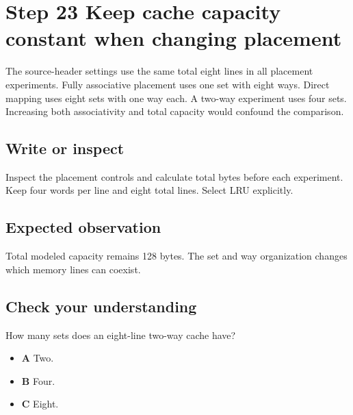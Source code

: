 \section{Step 23 Keep cache capacity constant when changing placement}\label{transpose-s23}

The source-header settings use the same total eight lines in all placement experiments. Fully associative placement uses one set with eight ways. Direct mapping uses eight sets with one way each. A two-way experiment uses four sets. Increasing both associativity and total capacity would confound the comparison.

\subsection{Write or inspect}
Inspect the placement controls and calculate total bytes before each experiment. Keep four words per line and eight total lines. Select LRU explicitly.

\subsection{Expected observation}
Total modeled capacity remains 128 bytes. The set and way organization changes which memory lines can coexist.

\subsection{Check your understanding}
How many sets does an eight-line two-way cache have?

\begin{itemize}
  \item \textbf{A} Two.
  \item \textbf{B} Four.
  \item \textbf{C} Eight.
\end{itemize}
